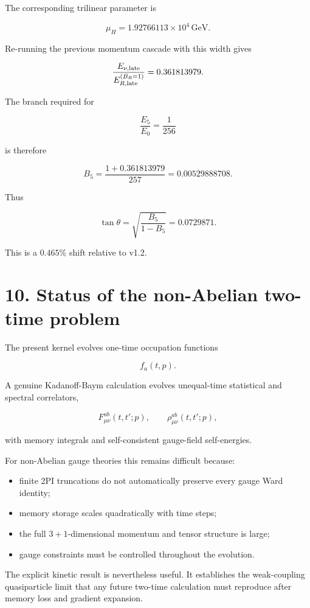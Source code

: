\documentclass[
  10pt,
]{article}
\providecommand{\tightlist}{%
  \setlength{\itemsep}{0pt}\setlength{\parskip}{0pt}}
\begin{document}
The corresponding trilinear parameter is

\[
\boxed{
\mu_H=1.92766113\times10^4\,\mathrm{GeV}.
}
\]

Re-running the previous momentum cascade with this width gives

\[
\frac{E_{\nu,\rm late}}
{E_{R,\rm late}^{(B_R=1)}}
=0.361813979.
\]

The branch required for

\[
\frac{E_5}{E_0}=\frac1{256}
\]

is therefore

\[
\boxed{
B_5
=
\frac{1+0.361813979}{257}
=0.00529888708.
}
\]

Thus

\[
\boxed{
\tan\theta
=
\sqrt{\frac{B_5}{1-B_5}}
=0.0729871.
}
\]

This is a \(0.465\%\) shift relative to v1.2.

\section{10. Status of the non-Abelian two-time
problem}\label{status-of-the-non-abelian-two-time-problem}

The present kernel evolves one-time occupation functions

\[
f_a(t,p).
\]

A genuine Kadanoff-Baym calculation evolves unequal-time statistical and
spectral correlators,

\[
F_{\mu\nu}^{ab}(t,t';p),
\qquad
\rho_{\mu\nu}^{ab}(t,t';p),
\]

with memory integrals and self-consistent gauge-field self-energies.

For non-Abelian gauge theories this remains difficult because:

\begin{itemize}
\tightlist
\item
  finite 2PI truncations do not automatically preserve every gauge Ward
  identity;
\item
  memory storage scales quadratically with time steps;
\item
  the full \(3+1\)-dimensional momentum and tensor structure is large;
\item
  gauge constraints must be controlled throughout the evolution.
\end{itemize}

The explicit kinetic result is nevertheless useful. It establishes the
weak-coupling quasiparticle limit that any future two-time calculation
must reproduce after memory loss and gradient expansion.
\end{document}
